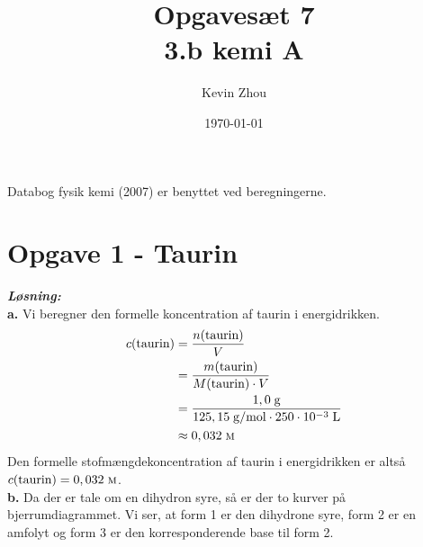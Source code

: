 \documentclass{report}
\title{Opgavesæt 7\\
{\Large \textbf{3.b kemi A}}}
\author{Kevin Zhou}
\date{\today}
\newcommand{\sol}{\setlength{\parindent}{0cm}\textbf{\textit{Løsning:}}\setlength{\parindent}{1cm}}
\begin{document}
\maketitle
\begin{note}
  Databog fysik kemi (2007) er benyttet ved beregningerne.
\end{note}
\section*{Opgave 1 - Taurin}
\sol \\
\textbf{a.}
Vi beregner den formelle koncentration af taurin i energidrikken.
\begin{equation*}
\begin{split}
  c(\text{taurin} )&=\frac{n(\text{taurin} )}{V}\\
  &=\frac{m(\text{taurin} )}{M(\text{taurin} ) \cdot V }\\
  &=\frac{1,0 \;\unit{g} }{125,15 \;\unit{g/mol} \cdot 250 \cdot 10 ^{-3} \;\unit{L} }\\
  &\approx 0,032 \;\unit{\textsc{m}} 
\end{split}
\end{equation*}
Den formelle stofmængdekoncentration af taurin i energidrikken er altså $c(\text{taurin} )=0,032 \;\unit{\textsc{m}} $. \\[1ex]
\textbf{b.}
Da der er tale om en dihydron syre, så er der to kurver på bjerrumdiagrammet.
Vi ser, at form 1 er den dihydrone syre, form 2 er en amfolyt og form 3 er den korresponderende base til form 2.
\end{document}
